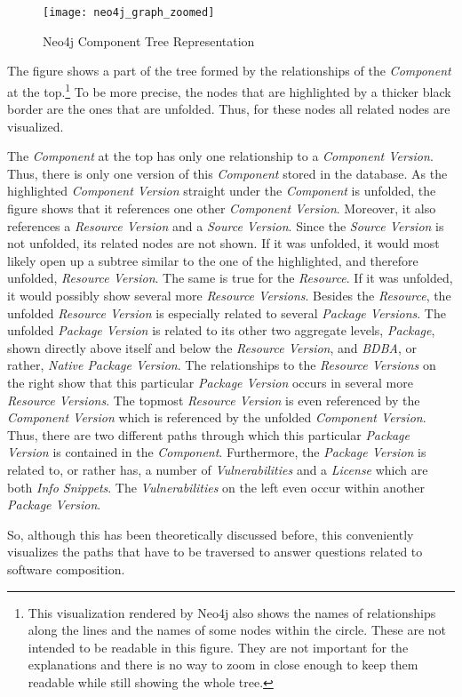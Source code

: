 \begin{figure}[H]
	\centering
	\texttt{[image: neo4j\_graph\_zoomed]}
	\caption[Neo4j Component Tree]{Neo4j Component Tree Representation }
	\label{fig:Neo4jComponentTree}
\end{figure}

The figure shows a part of the tree formed by the relationships of the \emph{Component} at the top.\footnote{This visualization rendered by Neo4j also shows the names of relationships along the lines and the names of some nodes within the circle. These are not intended to be readable in this figure. They are not important for the explanations and there is no way to zoom in close enough to keep them readable while still showing the whole tree.} To be more precise, the nodes that are highlighted by a thicker black border are the ones that are unfolded. Thus, for these nodes all related nodes are visualized.\par
The \emph{Component} at the top has only one relationship to a \emph{Component Version}. Thus, there is only one version of this \emph{Component} stored in the database. As the highlighted \emph{Component Version} straight under the \emph{Component} is unfolded, the figure shows that it references one other \emph{Component Version}. Moreover, it also references a \emph{Resource Version} and a \emph{Source Version}. Since the \emph{Source Version} is not unfolded, its related nodes are not shown. If it was unfolded, it would most likely open up a subtree similar to the one of the highlighted, and therefore unfolded, \emph{Resource Version}. The same is true for the \emph{Resource}. If it was unfolded, it would possibly show several more \emph{Resource Versions}. Besides the \emph{Resource}, the unfolded \emph{Resource Version} is especially related to several \emph{Package Versions}. The unfolded \emph{Package Version} is related to its other two aggregate levels, \emph{Package}, shown directly above itself and below the \emph{Resource Version}, and \emph{BDBA}, or rather, \emph{Native Package Version}. The relationships to the \emph{Resource Versions} on the right show that this particular \emph{Package Version} occurs in several more \emph{Resource Versions}. The topmost \emph{Resource Version} is even referenced by the \emph{Component Version} which is referenced by the unfolded \emph{Component Version}. Thus, there are two different paths through which this particular \emph{Package Version} is contained in the \emph{Component}. Furthermore, the \emph{Package Version} is related to, or rather has, a number of \emph{Vulnerabilities} and a \emph{License} which are both \emph{Info Snippets}. The \emph{Vulnerabilities} on the left even occur within another \emph{Package Version}.\par 
So, although this has been theoretically discussed before, this conveniently visualizes the paths that have to be traversed to answer questions related to software composition.


